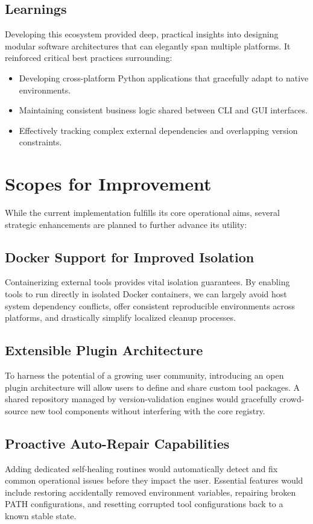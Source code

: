 \documentclass[12pt,a4paper]{report}
\begin{document}
\subsection{Learnings}
Developing this ecosystem provided deep, practical insights into designing modular software architectures that can elegantly span multiple platforms. It reinforced critical best practices surrounding:
\begin{itemize}
    \item Developing cross-platform Python applications that gracefully adapt to native environments.
    \item Maintaining consistent business logic shared between CLI and GUI interfaces.
    \item Effectively tracking complex external dependencies and overlapping version constraints.
\end{itemize}

\section{Scopes for Improvement}
While the current implementation fulfills its core operational aims, several strategic enhancements are planned to further advance its utility:

\subsection{Docker Support for Improved Isolation}
Containerizing external tools provides vital isolation guarantees. By enabling tools to run directly in isolated Docker containers, we can largely avoid host system dependency conflicts, offer consistent reproducible environments across platforms, and drastically simplify localized cleanup processes.

\subsection{Extensible Plugin Architecture}
To harness the potential of a growing user community, introducing an open plugin architecture will allow users to define and share custom tool packages. A shared repository managed by version-validation engines would gracefully crowd-source new tool components without interfering with the core registry.

\subsection{Proactive Auto-Repair Capabilities}
Adding dedicated self-healing routines would automatically detect and fix common operational issues before they impact the user. Essential features would include restoring accidentally removed environment variables, repairing broken PATH configurations, and resetting corrupted tool configurations back to a known stable state.
\end{document}
